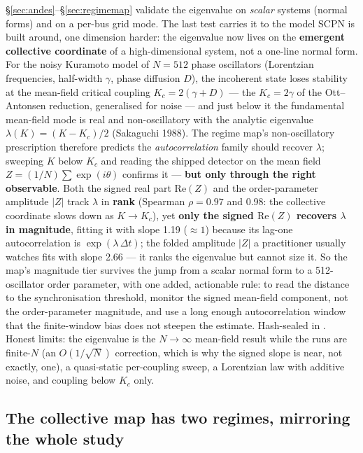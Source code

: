 \documentclass[11pt]{article}
\begin{document}
\S\ref{sec:andes}--\S\ref{sec:regimemap} validate the eigenvalue on
\emph{scalar} systems (normal forms) and on a per-bus grid mode. The
last test carries it to the model SCPN is built around, one dimension
harder: the eigenvalue now lives on the \textbf{emergent collective
coordinate} of a high-dimensional system, not a one-line normal form.
For the noisy Kuramoto model of $N = 512$ phase oscillators (Lorentzian
frequencies, half-width $\gamma$, phase diffusion $D$), the incoherent
state loses stability at the mean-field critical coupling
$K_c = 2(\gamma + D)$ --- the $K_c = 2\gamma$ of the Ott--Antonsen
reduction, generalised for noise --- and just below it the fundamental
mean-field mode is real and non-oscillatory with the analytic eigenvalue
$\lambda(K) = (K - K_c)/2$ (Sakaguchi 1988). The regime map's
non-oscillatory prescription therefore predicts the
\emph{autocorrelation} family should recover $\lambda$; sweeping $K$
below $K_c$ and reading the shipped detector on the mean field
$Z = (1/N) \sum \exp(i\theta)$ confirms it --- \textbf{but only through
the right observable}. Both the signed real part $\mathrm{Re}(Z)$ and
the order-parameter amplitude $|Z|$ track $\lambda$ in \textbf{rank}
(Spearman $\rho = 0.97$ and 0.98: the collective coordinate slows down
as $K \to K_c$), yet \textbf{only the signed $\mathrm{Re}(Z)$ recovers
$\lambda$ in magnitude}, fitting it with slope 1.19 ($\approx 1$)
because its lag-one autocorrelation is $\exp(\lambda \, \Delta t)$; the
folded amplitude $|Z|$ a practitioner usually watches fits with slope
2.66 --- it ranks the eigenvalue but cannot size it. So the map's
magnitude tier survives the jump from a scalar normal form to a
512-oscillator order parameter, with one added, actionable rule: to read
the distance to the synchronisation threshold, monitor the signed
mean-field component, not the order-parameter magnitude, and use a long
enough autocorrelation window that the finite-window bias does not
steepen the estimate. Hash-sealed in
.
Honest limits: the eigenvalue is the $N \to \infty$ mean-field result
while the runs are finite-$N$ (an $O(1/\sqrt{N})$ correction, which is
why the signed slope is near, not exactly, one), a quasi-static
per-coupling sweep, a Lorentzian law with additive noise, and coupling
below $K_c$ only.

\subsection{The collective map has two regimes, mirroring the whole
study}\label{sec:bimodal}
\end{document}
